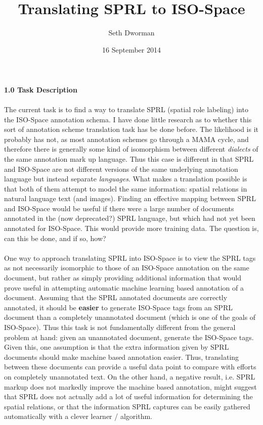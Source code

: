 \documentclass{article}
\title{Translating SPRL to ISO-Space}
\author{Seth Dworman}
\date{16 September 2014}
\begin{document}
\maketitle
$_{}$
\def\checkmark{\tikz\fill[scale=0.4](0,.35) -- (.25,0) -- (1,.7) -- (.25,.15) -- cycle;}
\newenvironment{attributes}
{\medskip\medskip
 \begin{tabular}{|l|l|}
 \hline} 
{\hline
 \end{tabular}
 \medskip\medskip}
\\
{\large {\bf 1.0 Task Description}}
\\
\\
The current task is to find a way to translate SPRL (spatial role labeling) into the ISO-Space annotation schema.  I have done little research as to whether this sort of annotation scheme translation task has be done before.  The likelihood is it probably has not, as most annotation schemes go through a MAMA cycle, and therefore there is generally some kind of isomorphism between different \emph{dialects} of the same annotation mark up language.  Thus this case is different in that SPRL and ISO-Space are not different versions of the same underlying annotation language but instead separate \emph{languages}.  What makes a translation possible is that both of them attempt to model the same information: spatial relations in natural language text (and images).  Finding an effective mapping between SPRL and ISO-Space would be useful if there were a large number of documents annotated in the (now deprecated?) SPRL language, but which had not yet been annotated for ISO-Space.  This would provide more training data.  The question is, can this be done, and if so, how?  
\\
\\
One way to approach translating SPRL into ISO-Space is to view the SPRL tags as not necessarily isomorphic to those of an ISO-Space annotation on the same document, but rather as simply providing additional information that would prove useful in attempting automatic machine learning based annotation of a document.  Assuming that the SPRL annotated documents are correctly annotated, it should be {\bf easier} to generate ISO-Space tags from an SPRL document than a completely unannotated document (which is one of the goals of ISO-Space).  Thus this task is not fundamentally different from the general problem at hand: given an unannotated document, generate the ISO-Space tags.  Given this, one assumption is that the extra information given by SPRL documents should make machine based annotation easier.  Thus, translating between these documents can provide a useful data point to compare with efforts on completely unannotated text.  On the other hand, a negative result, i.e. SPRL markup does not markedly improve the machine based annotation, might suggest that SPRL does not actually add a lot of useful information for determining the spatial relations, or that the information SPRL captures can be easily gathered automatically with a clever learner / algorithm.    
\end{document}
